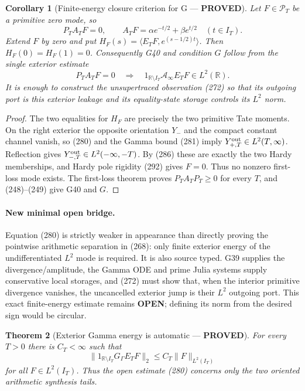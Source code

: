 \documentclass[11pt]{article}
\newtheorem{theorem}{Theorem}
\newtheorem{corollary}[theorem]{Corollary}
\newcommand{\PROVED}{\textcolor{green!45!black}{\textbf{PROVED}}}
\newcommand{\OPEN}{\textcolor{red!70!black}{\textbf{OPEN}}}
\begin{document}
\begin{corollary}[Finite-energy closure criterion for G --- \PROVED]
Let $F\in\mathcal P_T$ be a primitive zero mode, so
\begin{equation}
 P_TA_TF=0,
 \qquad
 A_TF=\alpha e^{-t/2}+\beta e^{t/2}\quad(t\in I_T).  \tag{279}
\end{equation}
Extend $F$ by zero and put
$H_F(s)=\langle E_TF,e^{(s-1/2)t}\rangle$.  Then
$H_F(0)=H_F(1)=0$.  Consequently G40 and condition $G$ follow from the
single exterior estimate
\begin{equation}
 \boxed{\quad
 P_TA_TF=0\quad\Longrightarrow\quad
 1_{\mathbb R\setminus I_T}\mathcal A_\infty E_TF
       \in L^2(\mathbb R).\quad}                      \tag{280}
\end{equation}
It is enough to construct the unsupertraced observation (272) so that its
outgoing port is this exterior leakage and its equality-state storage
controls its $L^2$ norm.
\end{corollary}

\begin{proof}
The two equalities for $H_F$ are precisely the two primitive Tate moments.
On the right exterior the opposite orientation $Y_-$ and the compact
constant channel vanish, so (280) and the Gamma bound (281) imply
$Y_{+,T}^{\rm out}\in L^2(T,\infty)$.  Reflection gives
$Y_{-,T}^{\rm out}\in L^2(-\infty,-T)$.  By (286) these are exactly the two
Hardy memberships, and Hardy pole rigidity (292) gives $F=0$.
Thus no nonzero first-loss mode exists.  The first-loss theorem proves
$P_TA_TP_T\ge0$ for every $T$, and (248)--(249) give G40 and $G$.
\end{proof}

\paragraph{New minimal open bridge.}
Equation (280) is strictly weaker in appearance than directly proving the
pointwise arithmetic separation in (268): only finite exterior energy of
the undifferentiated $L^2$ mode is required.  It is also source typed.  G39
supplies the divergence/amplitude, the Gamma ODE and prime Julia systems
supply conservative local storages, and (272) must show that, when the
interior primitive divergence vanishes, the uncancelled exterior jump is
their $L^2$ outgoing port.  This exact finite-energy estimate remains
\OPEN{}; defining its norm from the desired sign would be circular.

\begin{theorem}[Exterior Gamma energy is automatic --- \PROVED]
For every $T>0$ there is $C_T<\infty$ such that
\begin{equation}
 \|1_{\mathbb R\setminus I_T}G_\Gamma E_TF\|_2
 \le C_T\|F\|_{L^2(I_T)}                              \tag{281}
\end{equation}
for all $F\in L^2(I_T)$.  Thus the open estimate (280) concerns only the
two oriented arithmetic synthesis tails.
\end{theorem}
\end{document}

